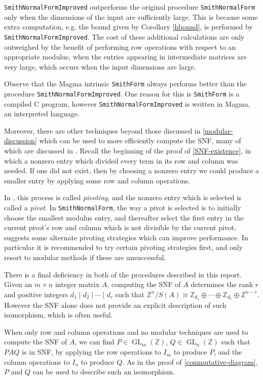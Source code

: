 \documentclass[12pt,a4paper,answers]{exam}
\newcommand{\Z}{\mathbb{Z}}
\DeclareMathOperator{\GL}{GL}
\theoremstyle{definition}
\begin{document}
\texttt{SmithNormalFormImproved} outperforms the original procedure \texttt{SmithNormalForm} only when the dimensions of the input are sufficiently large. This is because some extra computation, e.g. the bound given by Corollary \ref{hbound}, is performed by \texttt{SmithNormalFormImproved}. The cost of these additional calculations are only outweighed by the benefit of performing row operations with respect to an appropriate modulus, when the entries appearing in intermediate matrices are very large, which occurs when the input dimensions are large.

Observe that the {\sc Magma} intrinsic \texttt{SmithForm} always performs better than the procedure \texttt{SmithNormalFormImproved}. One reason for this is \texttt{SmithForm} is a compiled C program, however \texttt{SmithNormalFormImproved} is written in {\sc Magma}, an interpreted language.

Moreover, there are other techniques beyond those discussed in \autoref{modular-discussion} which can be used to more efficiently compute the SNF, many of which are discussed in \cite{havas}. Recall the beginning of the proof of \autoref{SNF-existence}, in which a nonzero entry which divided every term in its row and column was needed. If one did not exist, then by choosing a nonzero entry we could produce a smaller entry by applying some row and column operations.

In \cite{havas}, this process is called \emph{pivoting}, and the nonzero entry which is selected is called a \emph{pivot}. In \texttt{SmithNormalForm}, the way a pivot is selected is to initially choose the smallest modulus entry, and thereafter select the first entry in the current pivot's row and column which is not divisible by the current pivot. \cite{havas} suggests some alternate pivoting strategies which can improve performance. In particular it is recommended to try certain pivoting strategies first, and only resort to modular methods if these are unsuccessful.

There is a final deficiency in both of the procedures described in this report. Given an $m\times n$ integer matrix $A$, computing the SNF of $A$ determines the rank $r$ and positive integers $d_1\mid d_2\mid\cdots\mid d_r$ such that $\Z^n/S(A) \cong \Z_{d_1}\oplus\cdots\oplus\Z_{d_r}\oplus\Z^{n-r}$. However the SNF alone does not provide an explicit description of such isomorphism, which is often useful.

When only row and column operations and no modular techniques are used to compute the SNF of $A$, we can find $P\in\GL_m(\Z)$, $Q\in\GL_n(\Z)$ such that $PAQ$ is in SNF, by applying the row operations to $I_m$ to produce $P$, and the column operations to $I_n$ to produce $Q$. As in the proof of \autoref{commutative-diagram}, $P$ and $Q$ can be used to describe such an isomorphism.
\end{document}
